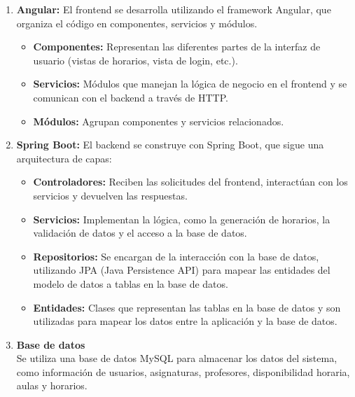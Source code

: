 \documentclass{article} %
\begin{document}
    \begin{enumerate}[font=\bfseries]
            \item \textbf{Angular:} El frontend se desarrolla utilizando el framework Angular, que organiza el código en componentes, servicios y módulos.            
            \begin{itemize}
                \item \textbf{Componentes:} Representan las diferentes partes de la interfaz de usuario (vistas de horarios, vista de login, etc.).
                \item \textbf{Servicios:} Módulos que manejan la lógica de negocio en el frontend y se comunican con el backend a través de HTTP.
                \item \textbf{Módulos:} Agrupan componentes y servicios relacionados.
            \end{itemize}
        
            \item \textbf{Spring Boot:} El backend se construye con Spring Boot, que sigue una arquitectura de capas:
            \begin{itemize}
                \item \textbf{Controladores:} Reciben las solicitudes del frontend, interactúan con los servicios y devuelven las respuestas.
                \item \textbf{Servicios:} Implementan la lógica, como la generación de horarios, la validación de datos y el acceso a la base de datos.
                \item \textbf{Repositorios:} Se encargan de la interacción con la base de datos, utilizando JPA (Java Persistence API) para mapear las entidades del modelo de datos a tablas en la base de datos.
                \item \textbf{Entidades:} Clases que representan las tablas en la base de datos y son utilizadas para mapear los datos entre la aplicación y la base de datos.
            \end{itemize}
        
        \item \textbf{Base de datos} \\
        \noindent Se utiliza una base de datos MySQL para almacenar los datos del sistema, como información de usuarios, asignaturas, profesores, disponibilidad horaria, aulas y horarios.
        

\end{enumerate}
\end{document}
